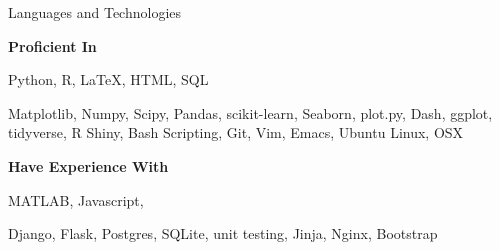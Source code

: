 \documentclass[]{mcdowellcv}
\begin{document}
	\begin{cvsection}{Languages and Technologies}
		\begin{cvsubsection}{}{}{}
      {\bfseries Proficient In}
      \begin{description}[style=multiline,align=left,labelindent=2em]
        \item [languages] Python, R, \LaTeX, HTML, SQL
				\item [technologies] Matplotlib, Numpy, Scipy, Pandas, scikit-learn,
          Seaborn, plot.py, Dash, ggplot, tidyverse, R Shiny, Bash Scripting,
          Git, Vim, Emacs, Ubuntu Linux, OSX
			\end{description}
		\end{cvsubsection}
		\begin{cvsubsection}{}{}{}
      {\bfseries Have Experience With}
      \begin{description}[style=multiline,align=left,labelindent=2em]
        \item [languages] MATLAB, Javascript,
        \item [technologies] Django, Flask, Postgres, SQLite, unit testing,
          Jinja, Nginx, Bootstrap
			\end{description}
		\end{cvsubsection}
	\end{cvsection}

\end{document}
